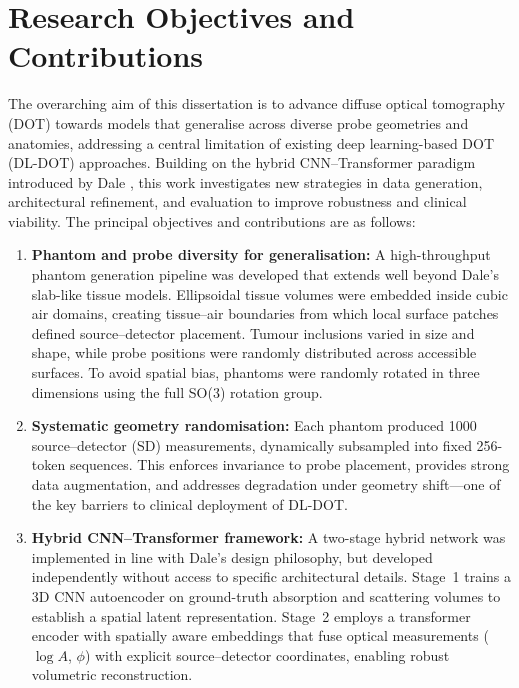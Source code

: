 \section{Research Objectives and Contributions}
The overarching aim of this dissertation is to advance diffuse optical tomography (DOT) towards models that generalise across diverse probe geometries and anatomies, addressing a central limitation of existing deep learning-based DOT (DL-DOT) approaches. Building on the hybrid CNN–Transformer paradigm introduced by Dale \cite{dale2024, dale2025}, this work investigates new strategies in data generation, architectural refinement, and evaluation to improve robustness and clinical viability. The principal objectives and contributions are as follows:

\begin{enumerate}
    \item \textbf{Phantom and probe diversity for generalisation:} A high-throughput phantom generation pipeline was developed that extends well beyond Dale’s slab-like tissue models. Ellipsoidal tissue volumes were embedded inside cubic air domains, creating tissue–air boundaries from which local surface patches defined source–detector placement. Tumour inclusions varied in size and shape, while probe positions were randomly distributed across accessible surfaces. To avoid spatial bias, phantoms were randomly rotated in three dimensions using the full SO(3) rotation group.
    
    \item \textbf{Systematic geometry randomisation:} Each phantom produced 1000 source–detector (SD) measurements, dynamically subsampled into fixed 256-token sequences. This enforces invariance to probe placement, provides strong data augmentation, and addresses degradation under geometry shift—one of the key barriers to clinical deployment of DL-DOT.
    
    \item \textbf{Hybrid CNN–Transformer framework:} A two-stage hybrid network was implemented in line with Dale’s design philosophy, but developed independently without access to specific architectural details. Stage~1 trains a 3D CNN autoencoder on ground-truth absorption and scattering volumes to establish a spatial latent representation. Stage~2 employs a transformer encoder with spatially aware embeddings that fuse optical measurements ($\log A$, $\phi$) with explicit source–detector coordinates, enabling robust volumetric reconstruction.
    

\end{enumerate}
